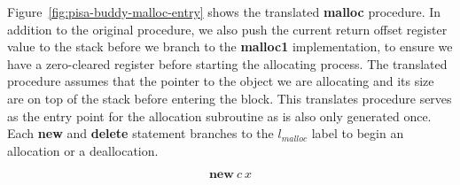 Figure~\ref{fig:pisa-buddy-malloc-entry} shows the translated \textbf{malloc} procedure. In addition to the original procedure, we also push the current return offset register value to the stack before we branch to the \textbf{malloc1} implementation, to ensure we have a zero-cleared register before starting the allocating process. The translated procedure assumes that the pointer to the object we are allocating and its size are on top of the stack before entering the block. This translates procedure serves as the entry point for the allocation subroutine as is also only generated once. Each \textbf{new} and \textbf{delete} statement branches to the $l_{malloc}$ label to begin an allocation or a deallocation.  

\begin{figure}[ht]
    \centering
    \begin{subfigure}[t]{0.495\linewidth}
        \vskip 0pt
        \centering
        \begin{equation*} 
            \textbf{new}\ c\ x
        \end{equation*}
\end{subfigure}
\end{figure}
